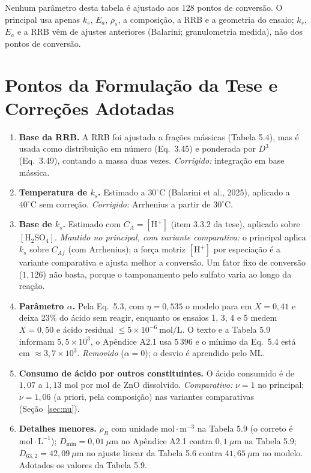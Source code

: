 \documentclass[12pt,a4paper]{article}
\begin{document}
Nenhum parâmetro desta tabela é ajustado aos 128 pontos de conversão. O principal usa apenas $k_s$, $E_a$, $\rho_s$, a composição, a RRB e a geometria do ensaio; $k_s$, $E_a$ e a RRB vêm de ajustes anteriores (Balarini; granulometria medida), não dos pontos de conversão.

\section{Pontos da Formulação da Tese e Correções Adotadas}
\label{sec:atencao}

\begin{enumerate}
    \item \textbf{Base da RRB.} A RRB foi ajustada a frações mássicas (Tabela 5.4), mas é usada como distribuição em número (Eq.~3.45) e ponderada por $D^3$ (Eq.~3.49), contando a massa duas vezes. \textit{Corrigido:} integração em base mássica.
    \item \textbf{Temperatura de $k_s$.} Estimado a $30^\circ\text{C}$ (Balarini et al., 2025), aplicado a $40^\circ\text{C}$ sem correção. \textit{Corrigido:} Arrhenius a partir de $30^\circ\text{C}$.
    \item \textbf{Base de $k_s$.} Estimado com $C_A = [\text{H}^+]$ (item 3.3.2 da tese), aplicado sobre $[\text{H}_2\text{SO}_4]$. \textit{Mantido no principal, com variante comparativa:} o principal aplica $k_s$ sobre $C_{Af}$ (com Arrhenius); a força motriz $[\text{H}^+]$ por especiação é a variante comparativa e ajusta melhor a conversão. Um fator fixo de conversão ($1{,}126$) não basta, porque o tamponamento pelo sulfato varia ao longo da reação.
    \item \textbf{Parâmetro $\alpha$.} Pela Eq.~5.3, com $\eta = 0{,}535$ o modelo para em $X = 0{,}41$ e deixa 23\% do ácido sem reagir, enquanto os ensaios 1, 3, 4 e 5 medem $X = 0{,}50$ e ácido residual $\le 5 \times 10^{-6}\ \text{mol/L}$. O texto e a Tabela 5.9 informam $5{,}5 \times 10^3$, o Apêndice A2.1 usa $5\,396$ e o mínimo da Eq.~5.4 está em $\approx 3{,}7 \times 10^3$. \textit{Removido} ($\alpha = 0$); o desvio é aprendido pelo ML.
    \item \textbf{Consumo de ácido por outros constituintes.} O ácido consumido é de $1{,}07$ a $1{,}13$ mol por mol de ZnO dissolvido. \textit{Comparativo:} $\nu = 1$ no principal; $\nu = 1{,}06$ (a priori, pela composição) nas variantes comparativas (Seção~\ref{sec:nu}).
    \item \textbf{Detalhes menores.} $\rho_B$ com unidade $\text{mol}\cdot\text{m}^{-3}$ na Tabela 5.9 (o correto é $\text{mol}\cdot\text{L}^{-1}$); $D_{\text{mín}} = 0{,}01\ \mu\text{m}$ no Apêndice A2.1 contra $0{,}1\ \mu\text{m}$ na Tabela 5.9; $D_{63{,}2} = 42{,}09\ \mu\text{m}$ no ajuste linear da Tabela 5.6 contra $41{,}65\ \mu\text{m}$ no modelo. Adotados os valores da Tabela 5.9.

\end{enumerate}
\end{document}
